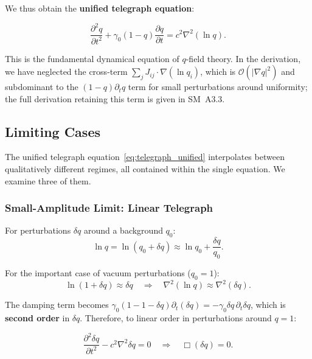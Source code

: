 \documentclass[aps,prd,twocolumn,showpacs,superscriptaddress,preprintnumbers]{revtex4-2}
\begin{document}
We thus obtain the \textbf{unified telegraph equation}:

\begin{equation}
\boxed{\frac{\partial^2 q}{\partial t^2} + \gamma_0(1-q)\frac{\partial q}{\partial t} = c^2\nabla^2(\ln q)}.
\label{eq:telegraph_unified}
\end{equation}

This is the fundamental dynamical equation of $q$-field theory.
In the derivation, we have neglected the cross-term $\sum_j J_{ij}\cdot\nabla(\ln q_i)$, which is $\mathcal{O}(|\nabla q|^2)$ and subdominant to the $(1-q)\partial_t q$ term for small perturbations around uniformity; the full derivation retaining this term is given in SM~A3.3.

\subsection{Limiting Cases}

The unified telegraph equation~\eqref{eq:telegraph_unified} interpolates between qualitatively different regimes, all contained within the single equation.
We examine three of them.

\subsubsection{Small-Amplitude Limit: Linear Telegraph}

For perturbations $\delta q$ around a background $q_0$:
\begin{equation}
\ln q = \ln(q_0 + \delta q) \approx \ln q_0 + \frac{\delta q}{q_0}.
\end{equation}

For the important case of vacuum perturbations ($q_0=1$):
\begin{equation}
\ln(1+\delta q) \approx \delta q \quad\Longrightarrow\quad \nabla^2(\ln q) \approx \nabla^2(\delta q).
\end{equation}

The damping term becomes $\gamma_0(1-1-\delta q)\partial_t(\delta q) = -\gamma_0\delta q\,\partial_t\delta q$, which is \textbf{second order} in $\delta q$.
Therefore, to linear order in perturbations around $q=1$:

\begin{equation}
\boxed{\frac{\partial^2 \delta q}{\partial t^2} - c^2\nabla^2\delta q = 0 \quad\Longrightarrow\quad \Box(\delta q) = 0}.
\label{eq:kg_vacuum}
\end{equation}
\end{document}
